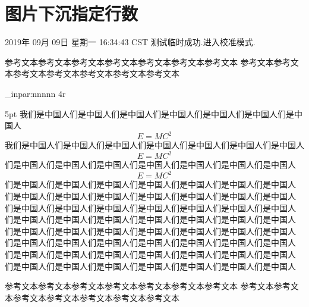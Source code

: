 \documentclass[a4paper,fontset = windowsnew]{ctexbook}
\begin{document}
\chapter{图片下沉指定行数}

2019年 09月 09日 星期一 16:34:43 CST
测试临时成功.进入校准模式.
\par
参考文本参考文本参考文本参考文本参考文本参考文本参考文本
参考文本参考文本参考文本参考文本参考文本参考文本参考文本
\par
\ExplSyntaxOn

\window_inpar:nnnnn {4}{r}{
}{5pt}
{
  我们是中国人们是中国人们是中国人们是中国人们是中国人们是中国人们是中国人
  $$E=MC^2$$
  我们是中国人们是中国人们是中国人们是中国人们是中国人们是中国人们是中国人
  $$E=MC^2$$
  们是中国人们是中国人们是中国人们是中国人们是中国人们是中国人们是中国人
  $$E=MC^2$$
  们是中国人们是中国人们是中国人们是中国人们是中国人们是中国人们是中国人
  们是中国人们是中国人们是中国人们是中国人们是中国人们是中国人们是中国人
  们是中国人们是中国人们是中国人们是中国人们是中国人们是中国人们是中国人
  们是中国人们是中国人们是中国人们是中国人们是中国人们是中国人们是中国人
  们是中国人们是中国人们是中国人们是中国人们是中国人们是中国人们是中国人
  们是中国人们是中国人们是中国人们是中国人们是中国人们是中国人们是中国人
  们是中国人们是中国人们是中国人们是中国人们是中国人们是中国人们是中国人
  们是中国人们是中国人们是中国人们是中国人们是中国人们是中国人们是中国人
}

\par
参考文本参考文本参考文本参考文本参考文本参考文本参考文本
参考文本参考文本参考文本参考文本参考文本参考文本参考文本
\par
\end{document}
